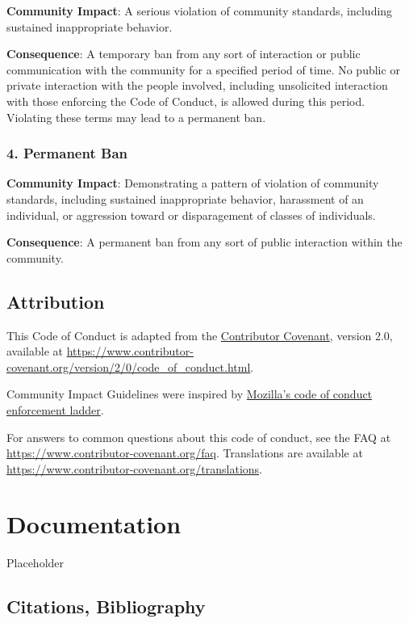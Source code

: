 \documentclass[
  fontsize=13pt,
  english,
  a4paper,
  openany, a4paper, oneside]{article}
\begin{document}
\textbf{Community Impact}: A serious violation of community standards, including
sustained inappropriate behavior.

\textbf{Consequence}: A temporary ban from any sort of interaction or public
communication with the community for a specified period of time. No public or
private interaction with the people involved, including unsolicited interaction
with those enforcing the Code of Conduct, is allowed during this period.
Violating these terms may lead to a permanent ban.

\hypertarget{permanent-ban}{%
\subsubsection{4. Permanent Ban}\label{permanent-ban}}

\textbf{Community Impact}: Demonstrating a pattern of violation of community
standards, including sustained inappropriate behavior, harassment of an
individual, or aggression toward or disparagement of classes of individuals.

\textbf{Consequence}: A permanent ban from any sort of public interaction within
the community.

\hypertarget{attribution}{%
\subsection{Attribution}\label{attribution}}

This Code of Conduct is adapted from the \href{https://www.contributor-covenant.org}{Contributor Covenant},
version 2.0, available at
\url{https://www.contributor-covenant.org/version/2/0/code_of_conduct.html}.

Community Impact Guidelines were inspired by
\href{https://github.com/mozilla/diversity}{Mozilla's code of conduct enforcement ladder}.

For answers to common questions about this code of conduct, see the FAQ at
\url{https://www.contributor-covenant.org/faq}. Translations are available
at \url{https://www.contributor-covenant.org/translations}.

\hypertarget{documentation}{%
\section{Documentation}\label{documentation}}

Placeholder

\hypertarget{citations-bibliography}{%
\subsection{Citations, Bibliography}\label{citations-bibliography}}
\end{document}
